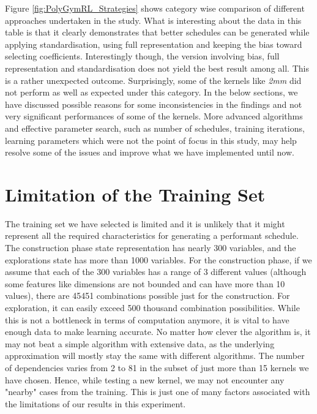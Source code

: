 \documentclass[logo,msc]{infthesis}           %
\begin{document}
Figure \ref{fig:PolyGymRL_Strategies} shows category wise comparison of different approaches undertaken in the study. What is interesting about the data in this table is that it clearly demonstrates that better schedules can be generated while applying standardisation, using full representation and keeping the bias toward selecting coefficients. Interestingly though, the version involving bias, full representation and standardisation does not yield the best result among all. This is a rather unexpected outcome. Surprisingly, some of the kernels like \textit{2mm} did not perform as well as expected under this category. In the below sections, we have discussed possible reasons for some inconsistencies in the findings and not very significant performances of some of the kernels. More advanced algorithms and effective parameter search, such as number of schedules, training iterations, learning parameters which were not the point of focus in this study, may help resolve some of the issues and improve what we have implemented until now.

\section{Limitation of the Training Set}
The training set we have selected is limited and it is unlikely that it might represent all the required characteristics for generating a performant schedule. The construction phase state representation has nearly 300 variables, and the explorations state has more than 1000 variables. For the construction phase, if we assume that each of the 300 variables has a range of 3 different values (although some features like dimensions are not bounded and can have more than 10 values), there are 45451 combinations possible just for the construction. For exploration, it can easily exceed 500 thousand combination possibilities. While this is not a bottleneck in terms of computation anymore, it is vital to have enough data to make learning accurate. No matter how clever the algorithm is, it may not beat a simple algorithm with extensive data, as the underlying approximation will mostly stay the same with different algorithms. The number of dependencies varies from 2 to 81 in the subset of just more than 15 kernels we have chosen. Hence, while testing a new kernel, we may not encounter any "nearby" cases from the training. This is just one of many factors associated with the limitations of our results in this experiment. 
\end{document}
